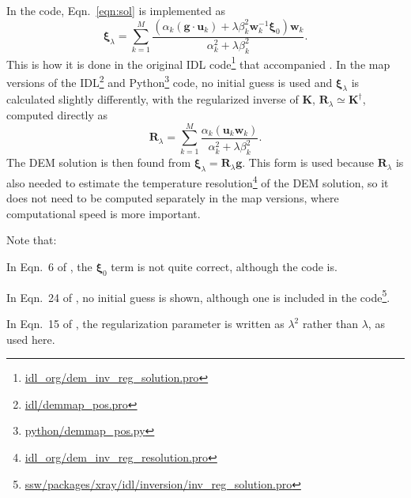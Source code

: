 \documentclass[12pt,a4paper]{article}
\newenvironment{itemize*}
{\begin{itemize} \setlength{\itemsep}{0pt} \setlength{\parskip}{0pt}}
{\end{itemize}}
\begin{document}
In the code, Eqn.~\ref{eqn:sol} is implemented as
\begin{equation}\label{eqn:solcode}
 \boldsymbol{\xi}_\lambda = \sum_{k=1}^{M}\frac{\left(\alpha_k(\mathbf{g}\cdot \mathbf{u}_k)+\lambda\beta_k^2\mathbf{w}_k^{-1}\boldsymbol{\xi}_0\right)\mathbf{w}_k}{\alpha_k^2 + \lambda\beta_k^2}.
\end{equation}
This is how it is done in the original IDL code\footnote{\href{https://github.com/ianan/demreg/blob/master/idl_org/dem_inv_reg_solution.pro}{idl\_org/dem\_inv\_reg\_solution.pro}} that accompanied \citet{2012A&A...539A.146H}. In the map versions \citep{2013A&A...553A..10H} of the IDL\footnote{\href{https://github.com/ianan/demreg/blob/261a85156c5a91c77cdc55750c58d0f0dfc7be07/idl/demmap_pos.pro}{idl/demmap\_pos.pro}} and Python\footnote{\href{https://github.com/ianan/demreg/blob/261a85156c5a91c77cdc55750c58d0f0dfc7be07/python/demmap_pos.py}{python/demmap\_pos.py}} code, no initial guess is used and $\boldsymbol{\xi}_\lambda$ is calculated slightly differently, with the regularized inverse of $\mathbf{K}$, $\mathbf{R}_\lambda \simeq \mathbf{K}^{\dagger}$, computed directly as
\begin{equation}\label{eqn:solmapcode}
 \mathbf{R}_\lambda = \sum_{k=1}^{M}\frac{\alpha_k\left(\mathbf{u}_k\mathbf{w}_k\right)}{\alpha_k^2 + \lambda\beta_k^2}.
\end{equation}
The DEM solution is then found from $\boldsymbol{\xi}_\lambda = \mathbf{R}_\lambda\mathbf{g}$. This form is used because $\mathbf{R}_\lambda$ is also needed to estimate the temperature resolution\footnote{\href{https://github.com/ianan/demreg/blob/master/idl_org/dem_inv_reg_resolution.pro}{idl\_org/dem\_inv\_reg\_resolution.pro}} of the DEM solution, so it does not need to be computed separately in the map versions, where computational speed is more important.

Note that:
\begin{itemize*}
\vspace{-5pt}
    \item In Eqn.~6 of \cite{2012A&A...539A.146H}, the $\boldsymbol{\xi}_0$ term is not quite correct, although the code is.
    \item In Eqn.~24 of \cite{2004SoPh..225..293K}, no initial guess is shown, although one is included in the code\footnote{\href{https://hesperia.gsfc.nasa.gov/ssw/packages/xray/idl/inversion/inv_reg_solution.pro}{ssw/packages/xray/idl/inversion/inv\_reg\_solution.pro}}.
    \item In Eqn.~15 of \citet{1992InvPr...8..849H}, the regularization parameter is written as $\lambda^2$ rather than $\lambda$, as used here.
\end{itemize*} 
\end{document}
